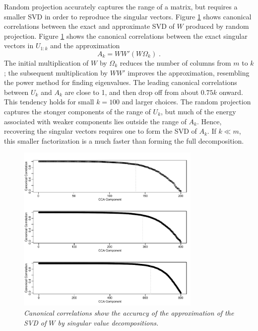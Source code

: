 \documentclass[10pt]{article}
\begin{document}
 Random projection accurately captures the range of a matrix, but requires a
 smaller SVD in order to reproduce the singular vectors.  Figure
 \ref{fig:approx} shows canonical correlations between the exact and approximate
 SVD of $W$ produced by random projection.  Figure \ref{fig:approx} shows the
 canonical correlations between the exact singular vectors in $U_{1:k}$ and the
 approximation
 \begin{equation}
      A_k = W W' (W \Omega_k)  \;.
 \label{eq:approx1}
 \end{equation}
 The initial multiplication of $W$ by $\Omega_k$ reduces the number of columns
 from $m$ to $k$; the subsequent multiplication by $W W'$ improves the
 approximation, resembling the power method for finding eigenvalues.  The
 leading canonical correlations between $U_{k}$ and $A_k$ are close to 1, and
 then drop off from about $0.75 k$ onward.  This tendency holds for small $k =
 100$ and larger choices.  The random projection captures the stonger components
 of the range of $U_k$, but much of the energy associated with weaker components
 lies outside the range of $A_k$.   Hence, recovering the singular vectors
 requires one to form the SVD of $A_k$.  If $k \ll m$, this smaller
 factorization is a much faster than forming the full decomposition. 

 \begin{figure}
 \caption{ \label{fig:approx} { \sl Canonical correlations show the accuracy of
 the approximation of the SVD of $W$ by singular value decompositions.}  }

 \centerline{
 \vspace{0.1in}
 \includegraphics[width=3.5in]{figures/approx} }
 \vspace{0.2in}
 \end{figure}
\end{document}
